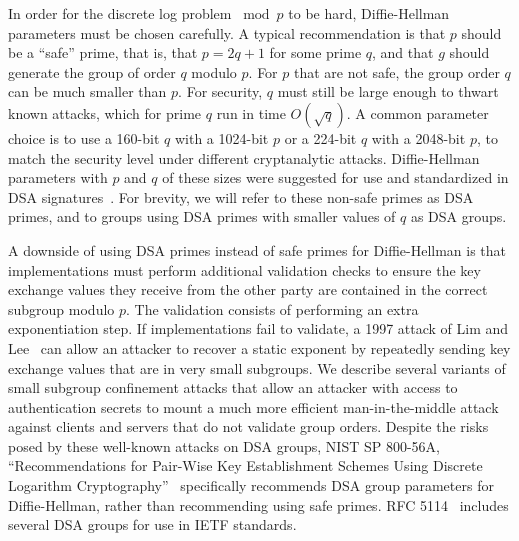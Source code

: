 


%

In order for the discrete log problem $\bmod p$ to be hard, Diffie-Hellman parameters
must be chosen carefully. A typical recommendation is that $p$ should be a
``safe'' prime, that is, that $p = 2q+1$ for some prime $q$, and that $g$
should generate the group of order $q$ modulo $p$. For $p$ that are not safe,
the group order $q$ can be much smaller than $p$. For security, $q$ must still
be large enough to thwart known attacks, which for prime $q$ run in time
$O(\sqrt{q})$. A common parameter choice is to use a 160-bit $q$ with a
1024-bit $p$ or a 224-bit $q$ with a 2048-bit $p$, to match the security level
under different cryptanalytic attacks. Diffie-Hellman parameters with $p$ and
$q$ of these sizes were suggested for use and standardized in DSA
signatures~\cite{fips186}. For brevity, we will refer to these non-safe primes as
DSA primes, and to groups using DSA primes with smaller values of $q$ as  DSA
groups.

A downside of using DSA primes instead of safe primes for Diffie-Hellman is
that implementations must perform additional validation checks to ensure the
key exchange values they receive from the other party are contained in the
correct subgroup modulo $p$. The validation consists of performing an extra
exponentiation step. If implementations fail to validate, a 1997 attack of Lim
and Lee~\cite{lim-1997} can allow an attacker to recover a static exponent by
repeatedly sending key exchange values that are in very small subgroups. We
describe several variants of small subgroup confinement attacks that allow an
attacker with access to authentication secrets to mount a much more efficient
man-in-the-middle attack against clients and servers that do not validate group
orders. Despite the risks posed by these well-known attacks on DSA groups, NIST SP 800-56A, ``Recommendations
for Pair-Wise Key Establishment Schemes Using Discrete Logarithm
Cryptography''~\cite{sp800} specifically recommends DSA group parameters
for Diffie-Hellman, rather than recommending using safe primes. RFC
5114~\cite{rfc5114} includes several DSA groups for use in IETF standards.

